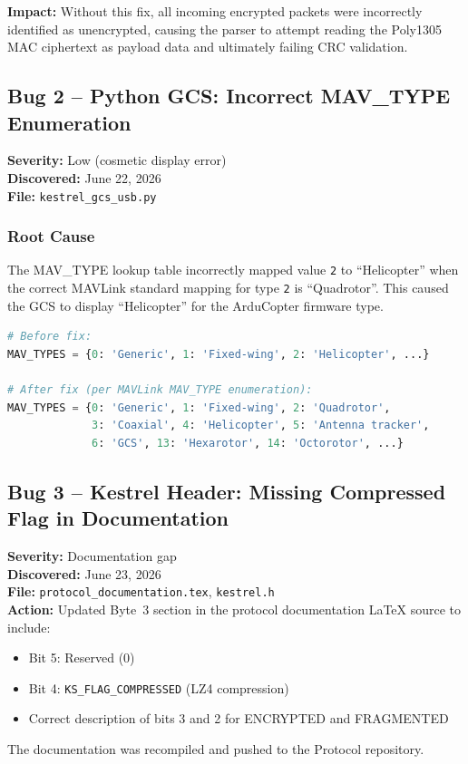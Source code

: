 \documentclass[11pt,a4paper]{article}
\begin{document}
\textbf{Impact:} Without this fix, all incoming encrypted packets were
incorrectly identified as unencrypted, causing the parser to attempt reading
the Poly1305 MAC ciphertext as payload data and ultimately failing CRC
validation.

\subsection{Bug 2 -- Python GCS: Incorrect MAV\_TYPE Enumeration}

\textbf{Severity:} Low (cosmetic display error) \\
\textbf{Discovered:} June 22, 2026 \\
\textbf{File:} \texttt{kestrel\_gcs\_usb.py}

\subsubsection{Root Cause}

The MAV\_TYPE lookup table incorrectly mapped value \texttt{2} to
``Helicopter'' when the correct MAVLink standard mapping for type \texttt{2}
is ``Quadrotor''. This caused the GCS to display ``Helicopter'' for the
ArduCopter firmware type.

\begin{lstlisting}[language=Python, style=pystyle,
    caption={MAV\_TYPE table correction}]
# Before fix:
MAV_TYPES = {0: 'Generic', 1: 'Fixed-wing', 2: 'Helicopter', ...}

# After fix (per MAVLink MAV_TYPE enumeration):
MAV_TYPES = {0: 'Generic', 1: 'Fixed-wing', 2: 'Quadrotor',
             3: 'Coaxial', 4: 'Helicopter', 5: 'Antenna tracker',
             6: 'GCS', 13: 'Hexarotor', 14: 'Octorotor', ...}
\end{lstlisting}

\subsection{Bug 3 -- Kestrel Header: Missing Compressed Flag in Documentation}

\textbf{Severity:} Documentation gap \\
\textbf{Discovered:} June 23, 2026 \\
\textbf{File:} \texttt{protocol\_documentation.tex}, \texttt{kestrel.h} \\
\textbf{Action:} Updated Byte~3 section in the protocol documentation LaTeX
source to include:
\begin{itemize}[noitemsep]
    \item Bit 5: Reserved (0)
    \item Bit 4: \texttt{KS\_FLAG\_COMPRESSED} (LZ4 compression)
    \item Correct description of bits 3 and 2 for ENCRYPTED and FRAGMENTED
\end{itemize}
The documentation was recompiled and pushed to the Protocol repository.
\end{document}
